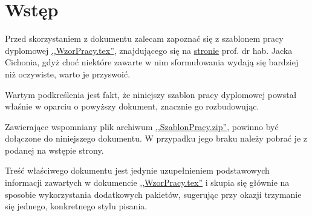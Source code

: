 \chapter{Wstęp}
\thispagestyle{chapterBeginStyle}


Przed skorzystaniem z dokumentu zalecam zapoznać się z szablonem pracy dyplomowej \href{http://cs.pwr.edu.pl/cichon/MaterialyDydaktyczne/PracDypl.zip}{,,WzorPracy.tex''}, znajdującego się na \href{http://cs.pwr.edu.pl/cichon/thesis.php}{stronie} prof. dr hab. Jacka Cichonia, gdyż choć niektóre zawarte w nim sformułowania wydają się bardziej niż oczywiste, warto je przyswoić.

Wartym podkreślenia jest fakt, że niniejszy szablon pracy dyplomowej powstał właśnie w oparciu o powyższy dokument, znacznie go rozbudowując.

Zawierające wspomniany plik archiwum \href{SzablonPracy.zip}{,,SzablonPracy.zip''}, powinno być dołączone do niniejszego dokumentu.
W przypadku jego braku należy pobrać je z podanej na wstępie strony.

Treść właściwego dokumentu jest jedynie uzupełnieniem podstawowych informacji zawartych w dokumencie \href{http://prac.im.pwr.wroc.pl/~cichon/MaterialyDydaktyczne/PracDypl.zip}{,,WzorPracy.tex''} i skupia się głównie na sposobie wykorzystania dodatkowych pakietów, sugerując przy okazji trzymanie się jednego, konkretnego stylu pisania.